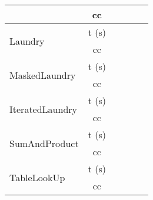 \begin{center}
\begin{table}[]
\begin{tabular}{@{}|l|c|l|l|l|l|l|l|@{}}
                                     & cc                         &                                     & \multicolumn{2}{l|}{}                 &                                          & \multicolumn{2}{l|}{}                   \\ \midrule
    \multirow{2}{*}{Laundry}         & t (s)                      &                                     & \multicolumn{2}{l|}{}                 &                                          & \multicolumn{2}{l|}{}                   \\ \cmidrule(l){2-8} 
                                     & cc                         &                                     & \multicolumn{2}{l|}{}                 &                                          & \multicolumn{2}{l|}{}                   \\ \midrule
    \multirow{2}{*}{MaskedLaundry}   & t (s)                      &                                     & \multicolumn{2}{l|}{}                 &                                          & \multicolumn{2}{l|}{}                   \\ \cmidrule(l){2-8} 
                                     & cc                         &                                     & \multicolumn{2}{l|}{}                 &                                          & \multicolumn{2}{l|}{}                   \\ \midrule
    \multirow{2}{*}{IteratedLaundry} & t (s)                      &                                     & \multicolumn{2}{l|}{}                 &                                          & \multicolumn{2}{l|}{}                   \\ \cmidrule(l){2-8} 
                                     & cc                         &                                     & \multicolumn{2}{l|}{}                 &                                          & \multicolumn{2}{l|}{}                   \\ \midrule
    \multirow{2}{*}{SumAndProduct}   & \multicolumn{1}{l|}{t (s)} &                                     & \multicolumn{2}{l|}{}                 &                                          & \multicolumn{2}{l|}{}                   \\ \cmidrule(l){2-8} 
                                     & cc                         &                                     & \multicolumn{2}{l|}{}                 &                                          & \multicolumn{2}{l|}{}                   \\ \midrule
    \multirow{2}{*}{TableLookUp}     & \multicolumn{1}{l|}{t (s)} &                                     & \multicolumn{2}{l|}{}                 &                                          & \multicolumn{2}{l|}{}                   \\ \cmidrule(l){2-8} 
                                     & cc                         &                                     & \multicolumn{2}{l|}{}                 &                                          & \multicolumn{2}{l|}{}                   \\ \bottomrule
    \end{tabular}
    \end{table}
    \end{center}
